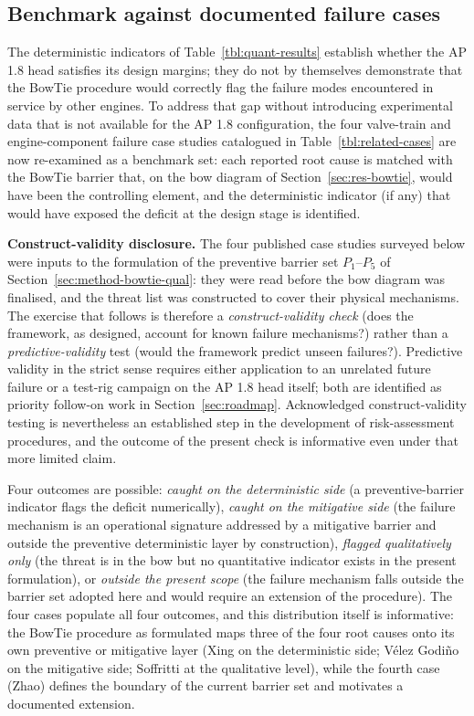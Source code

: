 \subsection{Benchmark against documented failure cases}
\label{sec:res-litvalidation}

The deterministic indicators of
Table~\ref{tbl:quant-results} establish whether the AP 1.8 head
satisfies its design margins; they do not by themselves demonstrate
that the BowTie procedure would correctly flag the failure modes
encountered in service by other engines. To address that gap without
introducing experimental data that is not available for the AP 1.8
configuration, the four valve-train and engine-component failure
case studies catalogued in Table~\ref{tbl:related-cases} are now
re-examined as a benchmark set: each reported root cause is matched
with the BowTie barrier that, on the bow diagram of
Section~\ref{sec:res-bowtie}, would have been the controlling
element, and the deterministic indicator (if any) that would have
exposed the deficit at the design stage is identified.

\noindent\textbf{Construct-validity disclosure.} The four published
case studies surveyed below were inputs to the formulation of the
preventive barrier set $P_{1}$--$P_{5}$ of
Section~\ref{sec:method-bowtie-qual}: they were read before the bow
diagram was finalised, and the threat list was constructed to cover
their physical mechanisms. The exercise that follows is therefore a
\emph{construct-validity check} (does the framework, as designed,
account for known failure mechanisms?) rather than a
\emph{predictive-validity} test (would the framework predict
unseen failures?). Predictive validity in the strict sense requires
either application to an unrelated future failure or a test-rig
campaign on the AP 1.8 head itself; both are identified as priority
follow-on work in Section~\ref{sec:roadmap}. Acknowledged
construct-validity testing is nevertheless an established step in
the development of risk-assessment procedures, and the outcome of
the present check is informative even under that more limited claim.

Four outcomes are possible: \emph{caught on the deterministic side}
(a preventive-barrier indicator flags the deficit numerically),
\emph{caught on the mitigative side} (the failure mechanism is an
operational signature addressed by a mitigative barrier and outside
the preventive deterministic layer by construction),
\emph{flagged qualitatively only} (the threat is in the bow but no
quantitative indicator exists in the present formulation), or
\emph{outside the present scope} (the failure mechanism falls
outside the barrier set adopted here and would require an extension
of the procedure). The four cases populate all four outcomes, and
this distribution itself is informative: the BowTie procedure as
formulated maps three of the four root causes onto its own
preventive or mitigative layer (Xing on the deterministic side;
V\'elez Godi\~no on the mitigative side; Soffritti at the qualitative
level), while the fourth case (Zhao) defines the boundary of the
current barrier set and motivates a documented extension.

